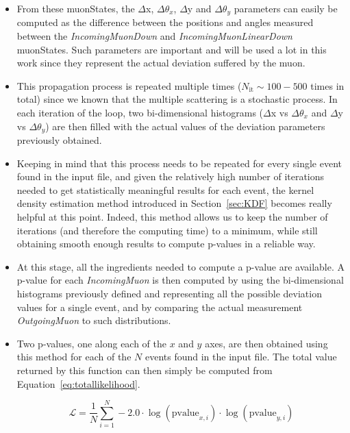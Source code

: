 \documentclass[a4paper, 11pt]{report}
\begin{document}
\begin{itemize}
\item From these muonStates, the $\Delta$x, $\Delta \theta_x$, $\Delta$y and $\Delta \theta_y$ parameters can easily be computed as the difference between the positions and angles measured between the \textit{IncomingMuonDown} and \textit{IncomingMuonLinearDown} muonStates. Such parameters are important and will be used a lot in this work since they represent the actual deviation suffered by the muon.
\item This propagation process is repeated multiple times ($N_{\text{it}} \sim 100-500$ times in total) since we known that the multiple scattering is a stochastic process. In each iteration of the loop, two bi-dimensional histograms ($\Delta$x vs $\Delta \theta_x$ and $\Delta$y vs $\Delta \theta_y$) are then filled with the actual values of the deviation parameters previously obtained.
\item Keeping in mind that this process needs to be repeated for every single event found in the input file, and given the relatively high number of iterations needed to get statistically meaningful results for each event, the kernel density estimation method introduced in Section~\ref{sec:KDF} becomes really helpful at this point. Indeed, this method allows us to keep the number of iterations (and therefore the computing time) to a minimum, while still obtaining smooth enough results to compute p-values in a reliable way.
\item At this stage, all the ingredients needed to compute a p-value are available. A p-value for each \textit{IncomingMuon} is then computed by using the bi-dimensional histograms previously defined and representing all the possible deviation values for a single event, and by comparing the actual measurement \textit{OutgoingMuon} to such distributions.
\item Two p-values, one along each of the $x$ and $y$ axes, are then obtained using this method for each of the $N$ events found in the input file. The total value returned by this function can then simply be computed from Equation~\ref{eq:totallikelihood}.

\begin{equation}
\label{eq:totallikelihood}
\mathcal{L} = \frac{1}{N} \sum_{i = 1}^N -2.0 \cdot \log(\text{pvalue}_{x, i}) \cdot \log(\text{pvalue}_{y, i})
\end{equation}



\end{itemize}
\end{document}
